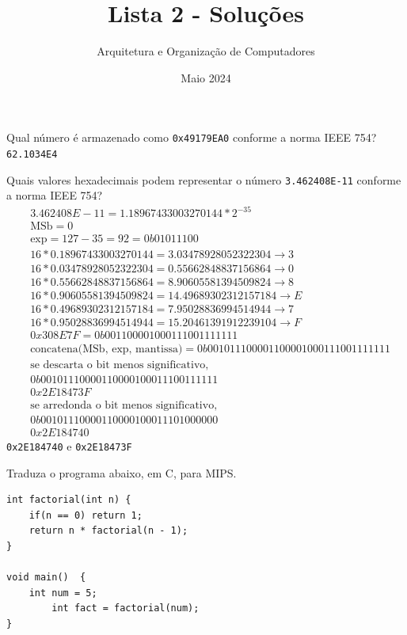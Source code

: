 \documentclass{article}
\title{\Huge Lista 2 - Soluções}
\author{\Large Arquitetura e Organização de Computadores}
\date{Maio 2024}
\begin{document}
\maketitle

\large
Qual número é armazenado como \verb|0x49179EA0| conforme a norma IEEE 754?
\verb|62.1034E4|

\bigskip
\bigbreak

Quais valores hexadecimais podem representar o número \verb|3.462408E-11| conforme a norma IEEE 754?
\begin{align*}
&3.462408E-11 = 1.18967433003270144*2^{-35} \\ 
&\text{MSb} = 0 \\
&\text{exp} = 127 - 35 = 92 = 0b01011100 \\
&16*0.18967433003270144 = 3.03478928052322304  \rightarrow 3 \\
&16*0.03478928052322304 = 0.55662848837156864  \rightarrow 0 \\
&16*0.55662848837156864 = 8.90605581394509824  \rightarrow 8 \\
&16*0.90605581394509824 = 14.49689302312157184 \rightarrow E \\
&16*0.49689302312157184 = 7.95028836994514944  \rightarrow 7 \\
&16*0.95028836994514944 = 15.20461391912239104 \rightarrow F \\
&0x308E7F = 0b001100001000111001111111 \\
&\text{concatena(MSb, exp, mantissa)} = 0b001011100001100001000111001111111 \\
&\text{se descarta o bit menos significativo,} \\
&0b00101110000110000100011100111111 \\
&0x2E18473F \\
&\text{se arredonda o bit menos significativo,} \\
&0b00101110000110000100011101000000 \\
&0x2E184740
\end{align*}
\verb|0x2E184740| e \verb|0x2E18473F|

\bigskip
\bigbreak

Traduza o programa abaixo, em C, para MIPS.
\begin{center}
    \begin{minipage}{0.6\textwidth}
        \begin{lstlisting}[frame=single]
int factorial(int n) {
	if(n == 0) return 1;
	return n * factorial(n - 1);
}

void main()  {
	int num = 5;
        int fact = factorial(num);
}
        \end{lstlisting}
    \end{minipage}
\end{center}
\end{document}
